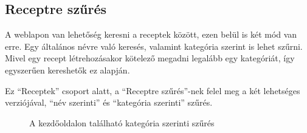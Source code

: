 \documentclass[12pt]{report}
\theoremstyle{definition}
\begin{document}
\subsection{Receptre szűrés}
A weblapon van lehetőség keresni a receptek között, ezen belül is két mód van erre. Egy általános névre való keresés, valamint kategória szerint is lehet szűrni. Mivel egy recept létrehozásakor kötelező megadni legalább egy kategóriát, így egyszerűen kereshetők ez alapján.

Ez  “Receptek” csoport alatt, a “Receptre szűrés”-nek felel meg a két lehetséges verziójával, “név szerinti” és “kategória szerinti” szűrés. 

\begin{figure}[H]%
    \centering
    \qquad
    \caption{A kezdőoldalon található kategória szerinti szűrés}%
    \label{fig:catSearch}%
\end{figure}
\end{document}
